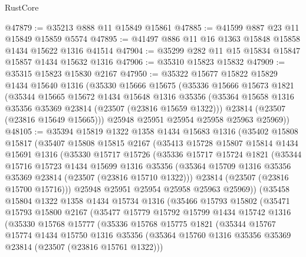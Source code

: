 \begin{lexlean}{RustCore}
\begin{coremodule}
@47879 := @35213 @888 @11 @15849 @15861
@47885 := @41599 @887 @23 @11 @15849 @15859 @5574
@47895 := @41497 @886 @11 @16 @1363 @15848 @15858 @1434 @15622 @1316 @41514
@47904 := @35299 @282 @11 @15 @15834 @15847 @15857 @1434 @15632 @1316
@47906 := @35310 @15823 @15832
@47909 := @35315 @15823 @15830 @2167
@47950 := @35322
    @15677
    @15822
    @15829
    @1434
    @15640
    @1316
    (@35330
      @15666
      @15675
      (@35336
        @15666
        @15673
        @1821
        (@35344
          @15665
          @15672
          @1434
          @15648
          @1316
          @35356
          (@35364 @15658 @1316 @35356 @35369 @23814 (@23507 (@23816 @15659 @1322)))
          @23814
          (@23507 (@23816 @15649 @15665)))
        @25948
        @25951
        @25954
        @25958
        @25963
        @25969))
@48105 := @35394
    @15819
    @1322
    @1358
    @1434
    @15683
    @1316
    (@35402
      @15808
      @15817
      (@35407
        @15808
        @15815
        @2167
        (@35413
          @15728
          @15807
          @15814
          @1434
          @15691
          @1316
          (@35330
            @15717
            @15726
            (@35336
              @15717
              @15724
              @1821
              (@35344
                @15716
                @15723
                @1434
                @15699
                @1316
                @35356
                (@35364 @15709 @1316 @35356 @35369 @23814 (@23507 (@23816 @15710 @1322)))
                @23814
                (@23507 (@23816 @15700 @15716)))
              @25948
              @25951
              @25954
              @25958
              @25963
              @25969))
          (@35458
            @15804
            @1322
            @1358
            @1434
            @15734
            @1316
            (@35466
              @15793
              @15802
              (@35471
                @15793
                @15800
                @2167
                (@35477
                  @15779
                  @15792
                  @15799
                  @1434
                  @15742
                  @1316
                  (@35330
                    @15768
                    @15777
                    (@35336
                      @15768
                      @15775
                      @1821
                      (@35344
                        @15767
                        @15774
                        @1434
                        @15750
                        @1316
                        @35356
                        (@35364 @15760 @1316 @35356 @35369 @23814 (@23507 (@23816 @15761 @1322)))

\end{coremodule}
\end{lexlean}
